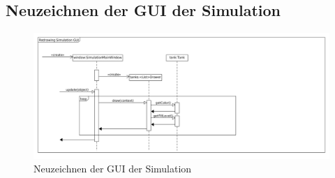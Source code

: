 \documentclass[parskip=full]{scrartcl}
\begin{document}
\subsection{Neuzeichnen der GUI der Simulation}
\begin{figure}[H]
  \centering
  \includegraphics[scale=0.35]{design/sequence-diagrams/simulation-redraw.png}
  \caption{Neuzeichnen der GUI der Simulation}
\end{figure}
\end{document}
